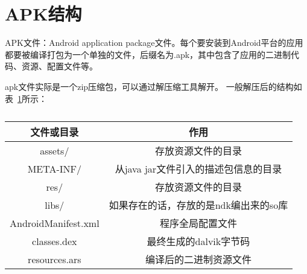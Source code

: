 \section{APK结构}
APK文件：Android application package文件。每个要安装到Android平台的应用都要被编译打包为一个单独的文件，后缀名为.apk，其中包含了应用的二进制代码、资源、配置文件等。

apk文件实际是一个zip压缩包，可以通过解压缩工具解开。
一般解压后的结构如表~\ref{tab:apk}所示：
\begin{table}[htbp]
\centering
\caption{\label{tab:apk}}
\begin{tabular}{|c|c|}
\hline
文件或目录 & 作用\\
\hline
assets/ & 存放资源文件的目录\\
\hline
META-INF/ & 从java jar文件引入的描述包信息的目录\\
\hline
res/ & 存放资源文件的目录\\
\hline
libs/ & 如果存在的话，存放的是ndk编出来的so库\\
\hline
AndroidManifest.xml & 程序全局配置文件\\
\hline
classes.dex & 最终生成的dalvik字节码\\
\hline
resources.ars & 编译后的二进制资源文件\\
\hline
\end{tabular}
\end{table}


